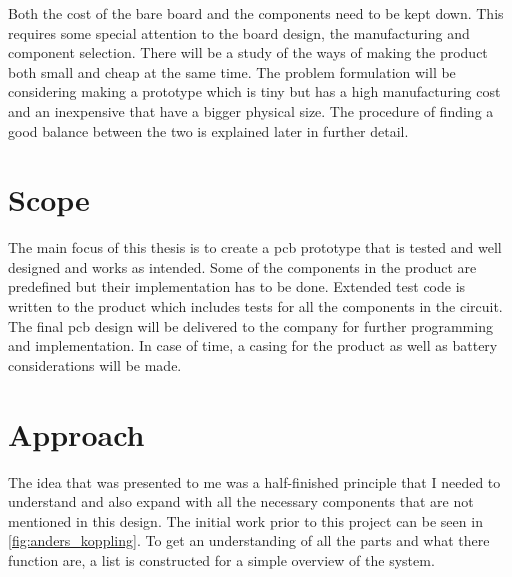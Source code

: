 Both the cost of the bare board and the components need to be kept down.  This requires some special attention to the board design, the manufacturing and component selection.
There will be a study of the ways of making the product both small and cheap at the same time. The problem formulation will be considering making a prototype which is tiny but has a high manufacturing cost and an inexpensive that have a bigger physical size. The procedure of finding a good balance between the two is explained later in further detail.

\section{Scope}
The main focus of this thesis is to create a \gls{pcb} prototype that is tested and well designed and works as intended. Some of the components in the product are predefined but their implementation has to be done.
Extended test code is written to the product which includes tests for all the components in the circuit.  
The final \gls{pcb} design will be delivered to the company for further programming and implementation.
In case of time, a casing for the product as well as battery considerations will be made.

\newpage
\section{Approach}
The idea that was presented to me was a half-finished principle that I needed to understand and also expand with all the necessary components that are not mentioned in this design. The initial work prior to this project can be seen in \autoref{fig:anders_koppling}.
To get an understanding of all the parts and what there function are, a list is constructed for a simple overview of the system.


